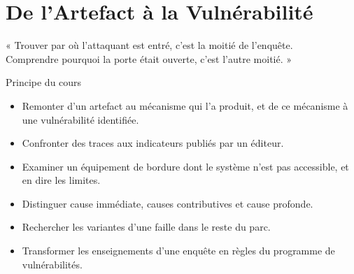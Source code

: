 
\chapter{De l'Artefact à la Vulnérabilité}
\label{chap:artefact-vuln}

\epigraph{%
    « Trouver par où l'attaquant est entré, c'est la moitié de l'enquête.\\
    Comprendre pourquoi la porte était ouverte, c'est l'autre moitié. »%
}{Principe du cours}


\begin{boxobjectifs}
\begin{itemize}
    \item Remonter d'un artefact au mécanisme qui l'a produit, et de ce
          mécanisme à une vulnérabilité identifiée.
    \item Confronter des traces aux indicateurs publiés par un éditeur.
    \item Examiner un équipement de bordure dont le système n'est pas
          accessible, et en dire les limites.
    \item Distinguer cause immédiate, causes contributives et cause
          profonde.
    \item Rechercher les variantes d'une faille dans le reste du parc.
    \item Transformer les enseignements d'une enquête en règles du programme
          de vulnérabilités.
\end{itemize}
\end{boxobjectifs}

